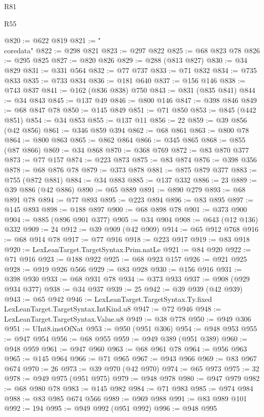 \begin{lexlean}{R81}
\begin{lexlean}{R55}
\begin{coremodule}
{{{{{{{{{{{{{{{{{{{{{{{{{{{{{{{{{{{{{{{{{{{{{{{{{{{{{{{{{{{{{{@820 := @622 @819
@821 := "\\coredata"
@822 := @298 @821
@823 := @297 @822
@825 := @68 @823 @78
@826 := @295 @825
@827 := @820 @826
@829 := @288 (@813 @827)
@830 := @34 @829
@831 := @331 @564
@832 := @77 @737
@833 := @71 @832
@834 := @735 @833
@835 := @733 @834
@836 := @181 @640
@837 := @156 @146
@838 := @743 @837
@841 := @162 (@836 @838) @750
@843 := @831 (@835 @841)
@844 := @34 @843
@845 := @137 @49
@846 := @800 @146
@847 := @398 @846
@849 := @68 @847 @78
@850 := @145 @849
@851 := @71 @850
@853 := @845 (@442 @851)
@854 := @34 @853
@855 := @137 @11
@856 := 22
@859 := @39 @856 (@42 @856)
@861 := @346 @859 @394
@862 := @68 @861
@863 := @800 @78
@864 := @800 @863
@865 := @862 @864
@866 := @345 @865
@868 := @855 (@87 @866)
@869 := @34 @868
@870 := @368 @769
@872 := @83 @870 @377
@873 := @77 @157
@874 := @223 @873
@875 := @83 @874
@876 := @398 @356
@878 := @68 @876 @78
@879 := @373 @878
@881 := @875 @879 @377
@883 := @755 (@872 @881)
@884 := @34 @883
@885 := @137 @332
@886 := 23
@889 := @39 @886 (@42 @886)
@890 := @65 @889
@891 := @890 @279
@893 := @68 @891 @78
@894 := @77 @893
@895 := @223 @894
@896 := @83 @895
@897 := @145 @893
@898 := @188 @897
@900 := @68 @898 @78
@901 := @373 @900
@904 := @885 (@896 @901 @377)
@905 := @34 @904
@908 := @643 (@12 @136) @332
@909 := 24
@912 := @39 @909 (@42 @909)
@914 := @65 @912 @768
@916 := @68 @914 @78
@917 := @77 @916
@918 := @223 @917
@919 := @83 @918
@920 := LexLeanTarget.TargetSyntax.Prim.natLe
@921 := @84 @920
@922 := @71 @916
@923 := @188 @922
@925 := @68 @923 @157
@926 := @921 @925
@928 := @919 @926 @566
@929 := @83 @928
@930 := @156 @916
@931 := @398 @930
@933 := @68 @931 @78
@934 := @373 @933
@937 := @908 (@929 @934 @377)
@938 := @34 @937
@939 := 25
@942 := @39 @939 (@42 @939)
@943 := @65 @942
@946 := LexLeanTarget.TargetSyntax.Ty.fixed LexLeanTarget.TargetSyntax.IntKind.u8
@947 := @72 @946
@948 := LexLeanTarget.TargetSyntax.Value.u8
@949 := @38 @778
@950 := @949 @306
@951 := UInt8.instOfNat
@953 := @950 (@951 @306)
@954 := @948 @953
@955 := @947 @954
@956 := @68 @955
@959 := @949 @389 (@951 @389)
@960 := @948 @959
@961 := @947 @960
@963 := @68 @961 @78
@964 := @956 @963
@965 := @145 @964
@966 := @71 @965
@967 := @943 @966
@969 := @83 @967 @674
@970 := 26
@973 := @39 @970 (@42 @970)
@974 := @65 @973
@975 := 32
@978 := @949 @975 (@951 @975)
@979 := @948 @978
@980 := @947 @979
@982 := @68 @980 @78
@983 := @145 @982
@984 := @71 @983
@985 := @974 @984
@988 := @83 @985 @674 @566
@989 := @969 @988
@991 := @83 @989 @101
@992 := 194
@995 := @949 @992 (@951 @992)
@996 := @948 @995
}}}}}}}}}}}}}}}}}}}}}}}}}}}}}}}}}}}}}}}}}}}}}}}}}}}}}}}}}}}}}}
\end{coremodule}
\end{lexlean}
\end{lexlean}
